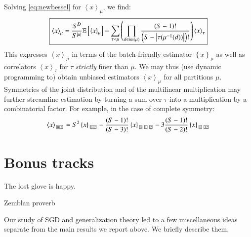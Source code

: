 \documentclass[openany, notitlepage, justified]{tufte-book}
\theoremstyle{plain}
\theoremstyle{definition}
\newcommand{\wrap}[1]{\left(#1\right)}
\newcommand{\wang}[1]{\left\langle#1\right\rangle}
\newcommand{\wabs}[1]{\left|#1\right|}
\newcommand{\wurl}[1]{\left\{#1\right\}}
\newcommand{\partitionbox}[1]{
    \text{
        \fboxsep=0.5pt
        \tiny
        \fbox{#1}
    }
}
\newcommand{\expct}[1]{\mathbb{E}\left[#1\right]}
\begin{document}
        Solving \ref{eq:newbessel} for $\wang{x}_\mu$, we find:
        \begin{equation*}
            \text{\fbox{$
            \wang{x}_\mu
            =
            \frac{S^D}{S^{\wabs{\mu}}}
            \expct{
                \wurl{x}_\mu
            }
            -
            \sum_{\tau < \mu} \wrap{
                \prod_{d\in im(\mu)}
                \frac{\wrap{S-1}!}{\wrap{S-\wabs{\tau(\mu^{-1}(d))}}!}
            }
            \wang{x}_\tau
            $}}
        \end{equation*}
        This expresses $\wang{x}_\mu$ in terms of the batch-friendly estimator
        $\wurl{x}_\mu$ as well as correlators $\wang{x}_\tau$ for $\tau$
        \emph{strictly} finer than $\mu$.  We may thus (use dynamic programming
        to) obtain unbiased estimators $\wang{x}_\mu$ for all partitions $\mu$.
        Symmetries of the joint distribution and of the multilinear
        multiplication may further streamline estimation by turning a sum over
        $\tau$ into a multiplication by a combinatorial factor.  For example,
        in the case of complete symmetry:
        $$
            \wang{x}_{\partitionbox{012}}
            =
            S^2
            \wurl{x}_{\partitionbox{012}}
            -
            \frac{(S-1)!}{(S-3)!}
            \wurl{x}_{\partitionbox{0}\partitionbox{1}\partitionbox{2}}
            -
            3\frac{(S-1)!}{(S-2)!}
            \wurl{x}_{\partitionbox{0}\partitionbox{12}}
        $$

\chapter{Bonus tracks}                   \label{appendix:bonus}

    \renewcommand{\textflush}{flushright}
    \setlength{\epigraphwidth}{0.25\columnwidth}
    \epigraph{
        The lost glove is happy.
    }{Zemblan proverb}%

    Our study of SGD and generalization theory led to a few miscellaneous ideas
    separate from the main results we report above.  We briefly describe them.

\end{document}
